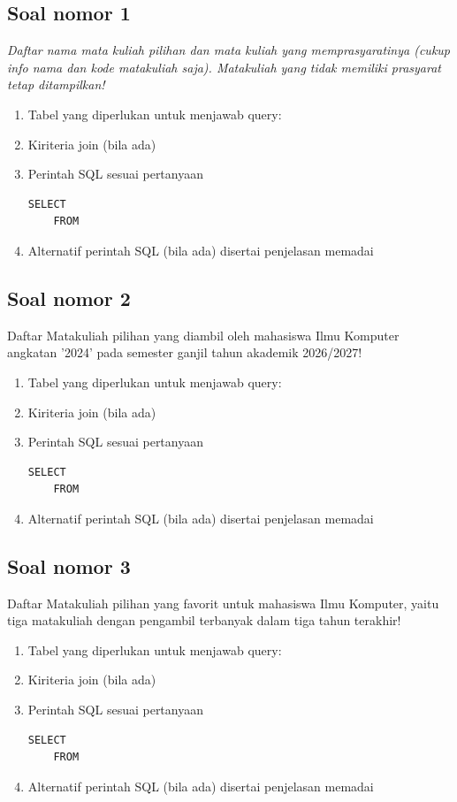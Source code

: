 \subsection{Soal nomor 1}
\begin{tcolorbox}
  \textit{Daftar nama mata kuliah pilihan dan mata kuliah yang memprasyaratinya (cukup info nama dan kode matakuliah saja).  Matakuliah yang tidak memiliki prasyarat tetap ditampilkan!}  
\end{tcolorbox}
\begin{enumerate}
    \itemsep0em
    \item Tabel yang diperlukan untuk menjawab query:
    \item Kiriteria join (bila ada)
    \item Perintah SQL sesuai pertanyaan
    \begin{lstlisting}
SELECT 
    FROM
    \end{lstlisting}
    \item Alternatif perintah SQL (bila ada) disertai penjelasan memadai
\end{enumerate}

\subsection{Soal nomor 2}
\begin{tcolorbox}   
Daftar Matakuliah pilihan yang diambil oleh mahasiswa Ilmu Komputer angkatan '2024' pada semester ganjil tahun akademik 2026/2027!
\end{tcolorbox}
\begin{enumerate}
    \itemsep0em
    \item Tabel yang diperlukan untuk menjawab query:
    \item Kiriteria join (bila ada)
    \item Perintah SQL sesuai pertanyaan
    \begin{lstlisting}
SELECT 
    FROM
    \end{lstlisting}
    \item Alternatif perintah SQL (bila ada) disertai penjelasan memadai
\end{enumerate}

\subsection{Soal nomor 3}
\begin{tcolorbox}
    Daftar Matakuliah pilihan yang favorit untuk mahasiswa Ilmu Komputer, yaitu tiga matakuliah dengan pengambil terbanyak dalam tiga tahun terakhir!
\end{tcolorbox}
\begin{enumerate}
    \itemsep0em
    \item Tabel yang diperlukan untuk menjawab query:
    \item Kiriteria join (bila ada)
    \item Perintah SQL sesuai pertanyaan
    \begin{lstlisting}
SELECT 
    FROM
    \end{lstlisting}
    \item Alternatif perintah SQL (bila ada) disertai penjelasan memadai
\end{enumerate}

